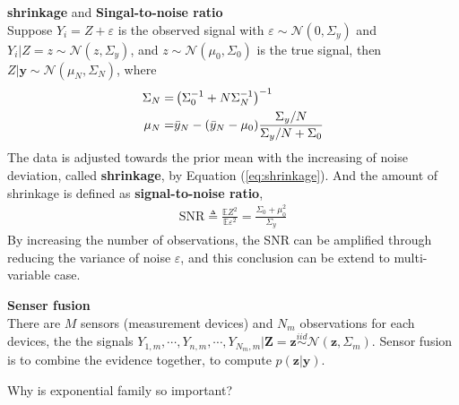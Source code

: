 \begin{example}
    \textbf{shrinkage} and \textbf{Singal-to-noise ratio}\\
    Suppose $Y_i=Z+\varepsilon$ is the observed signal with 
    $\varepsilon\sim\mathcal{N}(0,\Sigma_y)$ and
    $Y_i|Z=z\sim\mathcal{N}(z,\Sigma_y)$,
    and $z\sim\mathcal{N}(\mu_0,\Sigma_0)$ is the true signal, 
    then $Z|\bm{y}\sim\mathcal{N}(\mu_N,\Sigma_N)$, where
    \begin{align}
        \Sigma_N
        =& \left(\Sigma_0^{-1}+N\Sigma_N^{-1}\right)^{-1}\\
        \mu_N
        =& \Bar{y}_N - (\Bar{y}_N-\mu_0)\frac{\Sigma_y/N}{\Sigma_y/N+\Sigma_0} \label{eq:shrinkage}
    \end{align}
    The data is adjusted towards the prior mean with the increasing of noise deviation, called \textbf{shrinkage}, by Equation (\ref{eq:shrinkage}).
    And the amount of shrinkage is defined as \textbf{signal-to-noise ratio}, 
    \begin{gather}
        \text{SNR}\triangleq\frac{\mathbb{E}Z^2}{\mathbb{E}\varepsilon^2}=\frac{\Sigma_0+\mu_0^2}{\Sigma_y}
    \end{gather}
    By increasing the number of observations, 
    the SNR can be amplified through reducing the variance of noise $\varepsilon$, 
    and this conclusion can be extend to multi-variable case.
\end{example}
\begin{example}
    \textbf{Senser fusion}\\
    There are $M$ sensors (measurement devices) and $N_m$ observations for each devices, 
    the the signals $Y_{1,m},\cdots,Y_{n,m},\cdots,Y_{N_m,m}|\bm{Z}=\bm{z}\overset{iid}{\sim}\mathcal{N}(\bm{z},\Sigma_m)$. Sensor fusion is to combine the evidence together, to compute $p(\bm{z}|\bm{y})$.
\end{example}

\begin{question}
    Why is exponential family so important?
\end{question}

